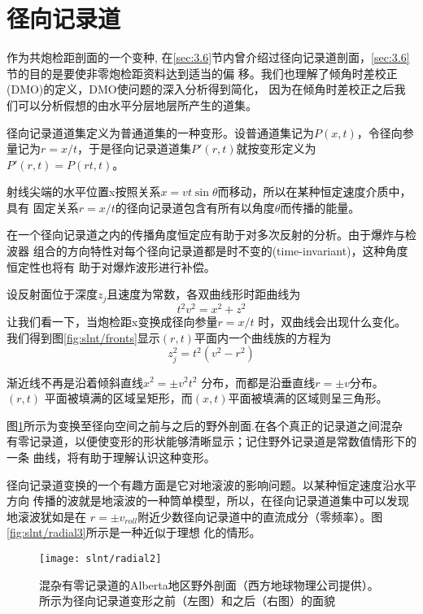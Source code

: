 \section{径向记录道}
\label{sec:5.1}

作为共炮检距剖面的一个变种,
在\ref{sec:3.6}节内曾介绍过径向记录道剖面，\ref{sec:3.6}节的目的是要使非零炮检距资料达到适当的偏
移。我们也理解了倾角时差校正(DMO)的定义，DMO使问题的深入分析得到简化，
因为在倾角时差校正之后我们可以分析假想的由水平分层地层所产生的道集。

径向记录道道集定义为普通道集的一种变形。设普通道集记为$P(x,t)$，令径向参
量记为$r=x/t$，于是径向记录道道集$P'(r,t)$就按变形定义为$P'(r,t)=P(rt,t)$。

射线尖端的水平位置x按照关系$x=vt\sin\theta$而移动，所以在某种恒定速度介质中，具有
固定关系$r=x/t$的径向记录道包含有所有以角度$\theta$而传播的能量。

在一个径向记录道之内的传播角度恒定应有助于对多次反射的分析。由于爆炸与检波器
组合的方向特性对每个径向记录道都是时不变的(time-invariant)，这种角度恒定性也将有
助于对爆炸波形进行补偿。

设反射面位于深度$z_j$且速度为常数，各双曲线形时距曲线为
\begin{equation}
t^2v^2=x^2+z^2
\label{eq:ex5.1.1}
\end{equation}
让我们看一下，当炮检距x变换成径向参量$r=x/t$
时，双曲线会出现什么变化。我们得到图\ref{fig:slnt/fronts}显示$(r,t)$平面内一个曲线族的方程为
\begin{equation}
z_j^2=t^2(v^2-r^2)
\label{eq:ex5.1.2}
\end{equation}

渐近线不再是沿着倾斜直线$x^2=\pm v^2t^2$
分布，而都是沿垂直线$r=\pm v$分布。$(r,t)$
平面被填满的区域呈矩形，而$(x,t)$平面被填满的区域则呈三角形。

图\ref{fig:slnt/radial2}所示为变换至径向空间之前与之后的野外剖面.在各个真正的记录道之间混杂
有零记录道，以便使变形的形状能够清晰显示；记住野外记录道是常数值情形下的一条
曲线，将有助于理解认识这种变形。

径向记录道变换的一个有趣方面是它对地滚波的影响问题。以某种恒定速度沿水平方向
传播的波就是地滚波的一种筒单模型，所以，在径向记录道道集中可以发现地滚波犹如是在
$r=\pm v_{roll}$附近少数径向记录道中的直流成分（零频率）。图\ref{fig:slnt/radial3}所示是一种近似于理想
化的情形。

\begin{figure}[H]
\centering
\texttt{[image: slnt/radial2]}
\caption[radial2]{混杂有零记录道的Alberta地区野外剖面（西方地球物理公司提供）。
所示为径向记录道变形之前（左图）和之后（右图）的面貌}
\label{fig:slnt/radial2}
\end{figure}

